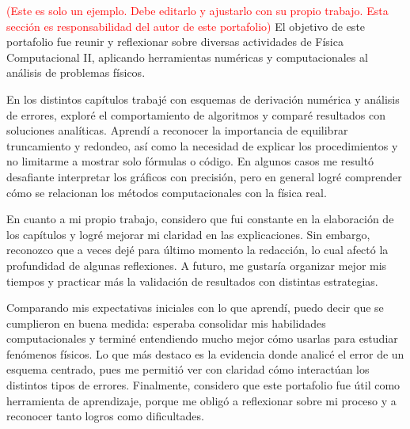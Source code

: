 \documentclass[../portafolio.tex]{subfiles}
\begin{document}
\textcolor{red}{(Este es solo un ejemplo. Debe editarlo y ajustarlo
  con su propio trabajo. Esta sección es responsabilidad del autor de este portafolio)}
El objetivo de este portafolio fue reunir y reflexionar sobre diversas
actividades de Física Computacional II, aplicando herramientas
numéricas y computacionales al análisis de problemas físicos.

En los distintos capítulos trabajé con esquemas de derivación numérica
y análisis de errores, exploré el comportamiento de algoritmos y
comparé resultados con soluciones analíticas. Aprendí a reconocer la
importancia de equilibrar truncamiento y redondeo, así como la
necesidad de explicar los procedimientos y no limitarme a mostrar solo
fórmulas o código. En algunos casos me resultó desafiante interpretar
los gráficos con precisión, pero en general logré comprender cómo se
relacionan los métodos computacionales con la física real.

En cuanto a mi propio trabajo, considero que fui constante en la
elaboración de los capítulos y logré mejorar mi claridad en las
explicaciones. Sin embargo, reconozco que a veces dejé para último
momento la redacción, lo cual afectó la profundidad de algunas
reflexiones. A futuro, me gustaría organizar mejor mis tiempos y
practicar más la validación de resultados con distintas estrategias.

Comparando mis expectativas iniciales con lo que aprendí, puedo decir
que se cumplieron en buena medida: esperaba consolidar mis habilidades
computacionales y terminé entendiendo mucho mejor cómo usarlas para
estudiar fenómenos físicos. Lo que más destaco es la evidencia donde
analicé el error de un esquema centrado, pues me permitió ver con
claridad cómo interactúan los distintos tipos de errores. Finalmente,
considero que este portafolio fue útil como herramienta de
aprendizaje, porque me obligó a reflexionar sobre mi proceso y a
reconocer tanto logros como dificultades.
\end{document}
